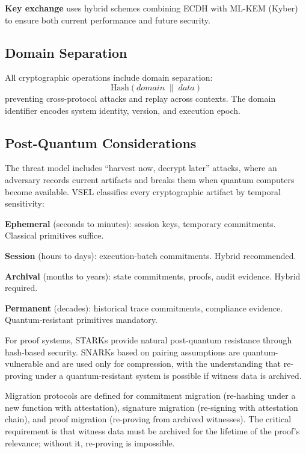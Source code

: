 \documentclass[11pt,a4paper]{article}
\theoremstyle{definition}
\newcommand{\Hash}{\mathrm{Hash}}
\begin{document}
\noindent\textbf{Key exchange} uses hybrid schemes combining ECDH with ML-KEM (Kyber) to ensure both current performance and future security.

\subsection{Domain Separation}
\label{subsec:crypto-domain-separation}

All cryptographic operations include domain separation:
\begin{equation}
\Hash(\mathit{domain} \;\|\; \mathit{data})
\end{equation}
preventing cross-protocol attacks and replay across contexts. The domain identifier encodes system identity, version, and execution epoch.

\subsection{Post-Quantum Considerations}
\label{subsec:pqc}

The threat model includes ``harvest now, decrypt later'' attacks, where an adversary records current artifacts and breaks them when quantum computers become available. VSEL classifies every cryptographic artifact by temporal sensitivity:

\noindent\textbf{Ephemeral} (seconds to minutes): session keys, temporary commitments. Classical primitives suffice.

\noindent\textbf{Session} (hours to days): execution-batch commitments. Hybrid recommended.

\noindent\textbf{Archival} (months to years): state commitments, proofs, audit evidence. Hybrid required.

\noindent\textbf{Permanent} (decades): historical trace commitments, compliance evidence. Quantum-resistant primitives mandatory.

For proof systems, STARKs provide natural post-quantum resistance through hash-based security. SNARKs based on pairing assumptions are quantum-vulnerable and are used only for compression, with the understanding that re-proving under a quantum-resistant system is possible if witness data is archived.

Migration protocols are defined for commitment migration (re-hashing under a new function with attestation), signature migration (re-signing with attestation chain), and proof migration (re-proving from archived witnesses). The critical requirement is that witness data must be archived for the lifetime of the proof's relevance; without it, re-proving is impossible.
\end{document}
